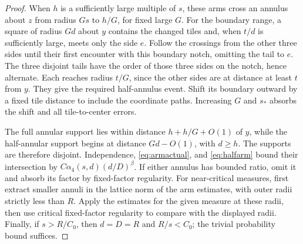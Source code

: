 \documentclass[11pt]{amsart}
\theoremstyle{remark}
\begin{document}
\begin{proof}
When $h$ is a sufficiently large multiple of $s$, these arms cross an annulus about $z$ from radius $Gs$ to $h/G$, for fixed large $G$. For the boundary range, a square of radius $Gd$ about $y$ contains the changed tiles and, when $t/d$ is sufficiently large, meets only the side $e$. Follow the crossings from the other three sides until their first encounter with this boundary notch, omitting the tail to $e$. The three disjoint tails have the order of those three sides on the notch, hence alternate. Each reaches radius $t/G$, since the other sides are at distance at least $t$ from $y$. They give the required half-annulus event. Shift its boundary outward by a fixed tile distance to include the coordinate paths. Increasing $G$ and $s_*$ absorbs the shift and all tile-to-center errors.

The full annular support lies within distance $h+h/G+O(1)$ of $y$, while the half-annular support begins at distance $Gd-O(1)$, with $d\ge h$. The supports are therefore disjoint. Independence, \eqref{eq:armactual}, and \eqref{eq:halfarm} bound their intersection by $C\alpha_4(s,d)(d/D)^\beta$. If either annulus has bounded ratio, omit it and absorb its factor by fixed-factor regularity. For near-critical measures, first extract smaller annuli in the lattice norm of the arm estimates, with outer radii strictly less than $R$. Apply the estimates for the given measure at these radii, then use critical fixed-factor regularity to compare with the displayed radii. Finally, if $s>R/C_0$, then $d=D=R$ and $R/s<C_0$; the trivial probability bound suffices.
\end{proof}
\end{document}
